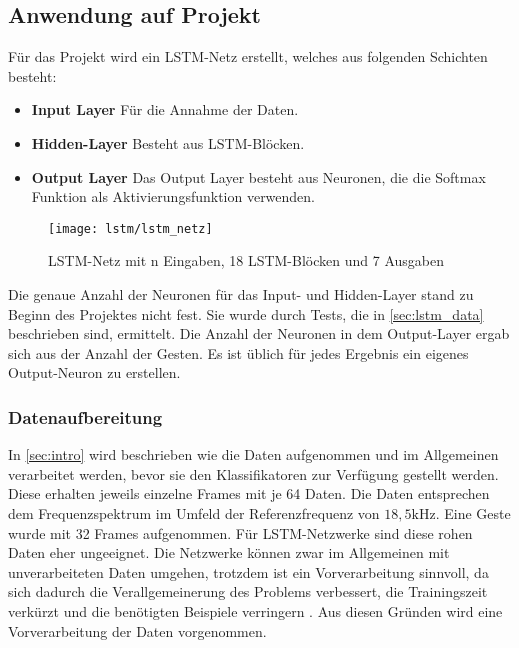 \subsection{Anwendung auf Projekt}
Für das Projekt wird ein LSTM-Netz erstellt, welches aus folgenden Schichten besteht:

\begin{itemize}
\item \textbf{Input Layer} Für die Annahme der Daten.
\item \textbf{Hidden-Layer} Besteht aus LSTM-Blöcken.
\item \textbf{Output Layer} Das Output Layer besteht aus Neuronen, die die 
Softmax Funktion als Aktivierungsfunktion verwenden.
\end{itemize}

\begin{figure}[htbp]
    \centering
   \texttt{[image: lstm/lstm\_netz]}
\caption[LSTM-Netz]{LSTM-Netz mit n Eingaben, 18 LSTM-Blöcken und 7 Ausgaben}
\label{fig:lstm_netz}
\end{figure}
Die genaue Anzahl der Neuronen für das Input- und Hidden-Layer stand zu Beginn
des Projektes nicht fest. Sie wurde durch Tests, die in \autoref{sec:lstm_data}
beschrieben sind, ermittelt. Die Anzahl der Neuronen in dem Output-Layer ergab
sich aus der Anzahl der Gesten. Es ist üblich für jedes Ergebnis ein eigenes
Output-Neuron zu erstellen.

\subsubsection{Datenaufbereitung}
\label{sec:lstm_data} 

In \autoref{sec:intro} wird beschrieben wie die Daten aufgenommen und im
Allgemeinen verarbeitet werden, bevor sie den Klassifikatoren zur Verfügung
gestellt werden. Diese erhalten jeweils einzelne Frames mit je 64 Daten. Die
Daten entsprechen dem Frequenzspektrum im Umfeld der Referenzfrequenz von
$18,5\text{kHz}$. Eine Geste wurde mit 32 Frames aufgenommen. Für
\ac{LSTM}-Netzwerke sind diese rohen Daten eher ungeeignet. Die Netzwerke können
zwar im Allgemeinen mit unverarbeiteten Daten umgehen, trotzdem ist ein
Vorverarbeitung sinnvoll, da sich dadurch die Verallgemeinerung des Problems
verbessert, die Trainingszeit verkürzt und die benötigten Beispiele verringern
\cite{RainerSchmoll2006}. Aus diesen Gründen wird eine Vorverarbeitung der Daten
vorgenommen.

